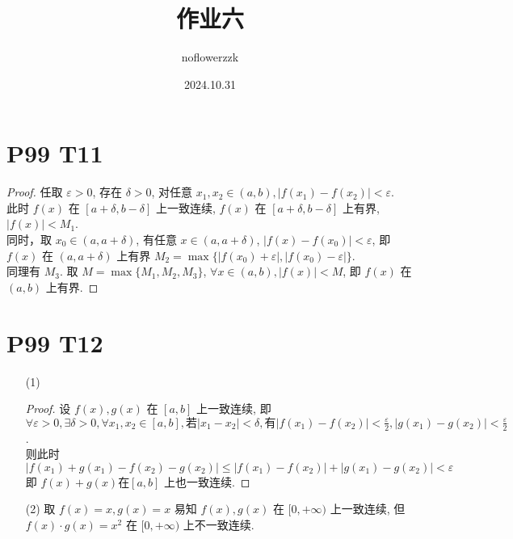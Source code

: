 \documentclass{article}
\title{作业六}
\author{noflowerzzk}
\date{2024.10.31}
\begin{document}
\maketitle

\section*{P99 T11}

\begin{proof}
    任取 $\varepsilon > 0$, 存在 $\delta > 0$, 对任意 $x_1, x_2 \in (a, b), \left\lvert f(x_1) - f(x_2)\right\rvert < \varepsilon$. \\
    此时 $f(x)$ 在 $[a + \delta, b - \delta]$ 上一致连续, $f(x)$ 在 $[a + \delta, b - \delta]$ 上有界, $\left\lvert f(x)\right\rvert < M_1 $. \\
    同时，取 $x_0 \in (a, a + \delta)$, 有任意 $x \in (a, a + \delta)$, $\left\lvert f(x) - f(x_0)\right\rvert < \varepsilon$, 即 $f(x)$ 在 $(a, a + \delta)$ 上有界 $M_2 = \max \{\left\lvert f(x_0) + \varepsilon\right\rvert , \left\lvert f(x_0) - \varepsilon\right\rvert \}$. \\
    同理有 $M_3$.
    取 $M = \max \{M_1, M_2, M_3\}$, $\forall x \in (a, b), \left\lvert f(x)\right\rvert < M$, 即 $f(x)$ 在 $(a, b)$  上有界.
\end{proof}

\section*{P99 T12}

\begin{itemize}
    \item [(1)]
    \begin{proof}
        设 $f(x), g(x)$ 在 $[a, b]$ 上一致连续, 即 $\forall \varepsilon > 0, \exists \delta > 0, \forall x_1, x_2 \in [a, b], \text{若}\left\lvert x_1 - x_2\right\rvert < \delta, \text{有} \left\lvert f(x_1) - f(x_2)\right\rvert < \frac{\varepsilon}{2}, \left\lvert g(x_1) - g(x_2)\right\rvert < \frac{\varepsilon}{2} $. \\
        则此时 $$
        \left\lvert f(x_1) + g(x_1) - f(x_2) - g(x_2)\right\rvert \leqslant \left\lvert f(x_1) - f(x_2)\right\rvert + \left\lvert g(x_1) - g(x_2)\right\rvert < \varepsilon
        $$
        即 $f(x) + g(x) \text{在} [a, b]$ 上也一致连续.
    \end{proof}
    \item [(2)]
    取 $f(x) = x, g(x) = x$
     易知 $f(x), g(x)$ 在 $[0, +\infty)$ 上一致连续, 但 $f(x)\cdot g(x) = x^2$ 在 $[0, +\infty)$ 上不一致连续. 
\end{itemize}
\end{document}
